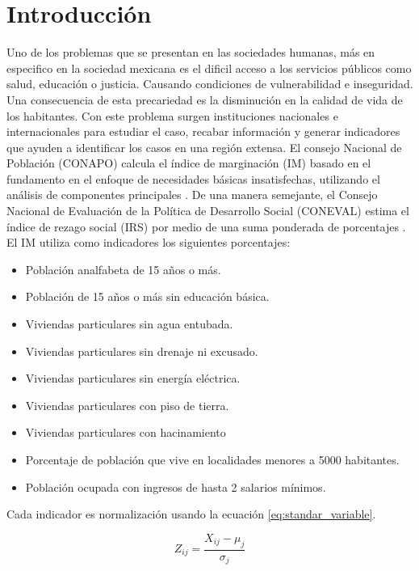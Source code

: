 \section{Introducción}

Uno de los problemas que se presentan en las sociedades humanas, más en especifico en la sociedad mexicana es el dificil acceso a los servicios públicos como salud, educación o justicia. Causando condiciones de vulnerabilidad e inseguridad. Una consecuencia de esta precariedad es la disminución en la calidad de vida de los habitantes. Con este problema surgen instituciones nacionales e internacionales para estudiar el caso, recabar información y generar indicadores que ayuden a identificar los casos en una región extensa. El consejo Nacional de Población (CONAPO) calcula el índice de marginación (IM) basado en el fundamento en el enfoque de necesidades básicas insatisfechas, utilizando el análisis de componentes principales \cite{conapo_2021}. De una manera semejante, el Consejo Nacional de Evaluación de la Política de Desarrollo Social (CONEVAL) estima el índice de rezago social (IRS) por medio de una suma ponderada de porcentajes \cite{CONEVAL_2007}. El IM utiliza como indicadores\cite{CONAPO_1995} los siguientes porcentajes:

\begin{itemize}
    \item Población analfabeta de 15 años o más.
    \item Población de 15 años o más sin educación básica.
    \item Viviendas particulares sin agua entubada.
    \item Viviendas particulares sin drenaje ni excusado.
    \item Viviendas particulares sin energía eléctrica.
    \item Viviendas particulares con piso de tierra.
    \item Viviendas particulares con hacinamiento
    \item Porcentaje de población que vive en localidades menores a 5000 habitantes.
    \item Población ocupada con ingresos de hasta 2 salarios mínimos.
\end{itemize}

Cada indicador es normalización usando la ecuación \ref{eq:standar_variable}.

\begin{equation}
    Z_{ij} = \frac{X_{ij}-\mu_j}{\sigma_j} \label{eq:standar_variable}
\end{equation}

